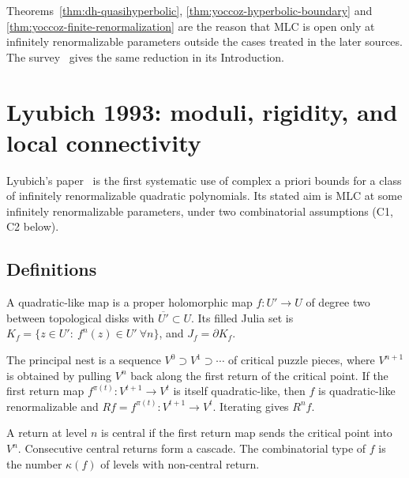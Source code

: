 \begin{remark}
Theorems~\ref{thm:dh-quasihyperbolic}, \ref{thm:yoccoz-hyperbolic-boundary} and
\ref{thm:yoccoz-finite-renormalization} are the reason that MLC is open only at
infinitely renormalizable parameters outside the cases treated in the later
sources.  The survey~\cite{DudkoMLC} gives the same reduction in its Introduction.
\end{remark}

\section{Lyubich 1993: moduli, rigidity, and local connectivity}
\label{sec:digest-lyubich-1993}

Lyubich's paper~\cite{LyubichGeometry} is the first systematic use of complex
a priori bounds for a class of infinitely renormalizable quadratic polynomials.
Its stated aim is MLC at some infinitely renormalizable parameters, under two
combinatorial assumptions (C1, C2 below).

\subsection*{Definitions}

\begin{definition}
\label{def:quadratic-like}
A quadratic-like map is a proper holomorphic map $f\colon U'\to U$ of degree two
between topological disks with $\overline{U'}\subset U$.  Its filled Julia set is
$K_f=\{z\in U':\ f^n(z)\in U'\ \forall n\}$, and $J_f=\partial K_f$.
\end{definition}

\begin{definition}
\label{def:digest-principal-nest}
The principal nest is a sequence $V^0\supset V^1\supset\cdots$ of critical
puzzle pieces, where $V^{n+1}$ is obtained by pulling $V^n$ back along the first
return of the critical point.  If the first return map $f^{\pi(t)}\colon V^{t+1}\to V^t$
is itself quadratic-like, then $f$ is quadratic-like renormalizable and
$Rf=f^{\pi(t)}\colon V^{t+1}\to V^t$.  Iterating gives $R^nf$.
\end{definition}

\begin{definition}
\label{def:combinatorial-type}
A return at level $n$ is central if the first return map sends the critical point
into $V^n$.  Consecutive central returns form a cascade.  The combinatorial type
of $f$ is the number $\kappa(f)$ of levels with non-central return.
\end{definition}

